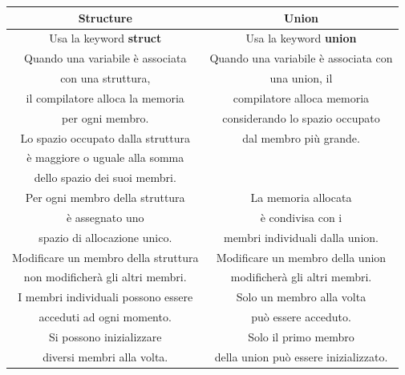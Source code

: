 \begin{tabular}{|c|c|}
	\hline
	\textbf{Structure} & \textbf{Union} \\
	\hline
	\textsf{\small Usa la keyword \textbf{struct}} & \textsf{\small Usa la keyword \textbf{union}}\\
	\hline
	\textsf{\small Quando una variabile è associata } & \textsf{\small Quando una variabile è associata con } \\
	\textsf{\small con una struttura,} & \textsf{\small una union, il} \\
	\textsf{\small il compilatore alloca la memoria } & \textsf{\small  compilatore alloca memoria } \\
	\textsf{\small per ogni membro.} & \textsf{\small considerando lo spazio occupato } \\
	\textsf{\small Lo spazio occupato dalla struttura} & \textsf{\small dal membro più grande.} \\
	\textsf{\small è maggiore o uguale alla somma} & \textsf{\small } \\
	\textsf{\small dello spazio dei suoi membri.} & \textsf{\small } \\
	\hline
	\textsf{\small Per ogni membro della struttura} & \textsf{\small La memoria allocata} \\
	\textsf{\small è assegnato uno } & \textsf{\small è condivisa con i } \\
	\textsf{\small spazio di allocazione unico.} & \textsf{\small membri individuali dalla union.} \\
	\hline
	\textsf{\small Modificare un membro della struttura} & \textsf{\small Modificare un membro della union} \\
	\textsf{\small non modificherà gli altri membri.} & \textsf{\small modificherà gli altri membri.} \\
	\hline
	\textsf{\small I membri individuali possono essere} & \textsf{\small Solo un membro alla volta} \\
	\textsf{\small acceduti ad ogni momento.} & \textsf{\small può essere acceduto.} \\
	\hline
	\textsf{\small Si possono inizializzare } & \textsf{\small Solo il primo membro} \\
	\textsf{\small diversi membri alla volta.} & \textsf{\small della union può essere inizializzato.} \\
	\hline
\end{tabular}


